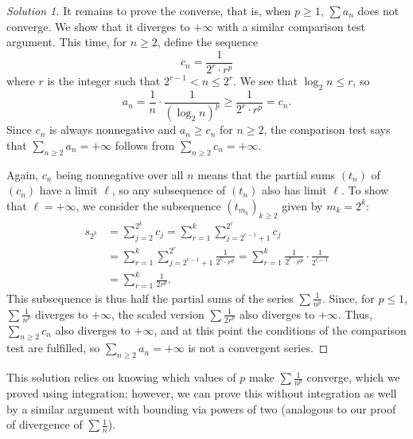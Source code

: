 \documentclass[11pt]{scrartcl}
\theoremstyle{problem}
\theoremstyle{remark}
\newenvironment{remark}
{\renewcommand\theremarknumbered{\hspace{-\the\fontdimen2\font\space}}\remarknumbered}
{\endremarknumbered}
\begin{document}
\begin{proof}[Solution 1]
	It remains to prove the converse, that is, when $p\ge 1$, $\sum a_n$
	does not converge. We show that it diverges to $+\infty$
	with a similar comparison test argument.
	This time, for $n\ge 2$, define the sequence
	\[c_n = \frac{1}{2^r\cdot r^p}\]
	where $r$ is the integer such that $2^{r-1} < n \le 2^r$.
	We see that $\log_2 n \le r$, so
	\[a_n = \frac 1n\cdot\frac{1}{(\log_2n)^p} \ge
	\frac{1}{2^r\cdot r^p} = c_n.\]
	Since $c_n$ is always nonnegative and $a_n\ge c_n$ for $n\ge 2$,
	the comparison test says that $\sum_{n\ge 2}a_n = +\infty$
	follows from $\sum_{n\ge 2}c_n = +\infty$.
	
	Again, $c_n$ being nonnegative over all $n$ means that the partial sums
	$(t_n)$ of $(c_n)$ have a limit $\ell$, so any subsequence of $(t_n)$
	also has limit $\ell$. To show that $\ell = +\infty$,
	we consider the subsequence $(t_{m_k})_{k\ge2}$ given by $m_k = 2^{k}$:
	\begin{align*}
		s_{2^k} &= \sum_{j=2}^{2^k} c_j =
		\sum_{r=1}^{k} \sum_{j=2^{r-1}+1}^{2^r} c_j\\
		&= \sum_{r=1}^{k} \sum_{j=2^{r-1}+1}^{2^r} \frac{1}{2^r\cdot r^p}
		= \sum_{r=1}^k \frac{1}{2^r\cdot r^p}\cdot \frac{1}{2^{r-1}}\\
		&= \sum_{r=1}^k \frac{1}{2r^p}.
	\end{align*}
	This subsequence is thus half the partial sums of the
	series $\sum \frac1{n^p}$. Since, for $p\le 1$, $\sum \frac1{n^p}$
	diverges to $+\infty$, the scaled version $\sum\frac1{2r^p}$
	also diverges to $+\infty$.
	Thus, $\sum_{n\ge2} c_n$ also diverges to $+\infty$, and at this point
	the conditions of the comparison test are fulfilled,
	so $\sum_{n\ge2} a_n = +\infty$ is not a convergent series.
\end{proof}

\begin{remark}
	This solution relies on knowing which values of $p$
	make $\sum \frac 1{n^p}$ converge, which we proved using integration;
	however, we can prove this without integration as well
	by a similar argument with bounding via powers of two
	(analogous to our proof of divergence of $\sum \frac 1n$).
\end{remark}
\end{document}
